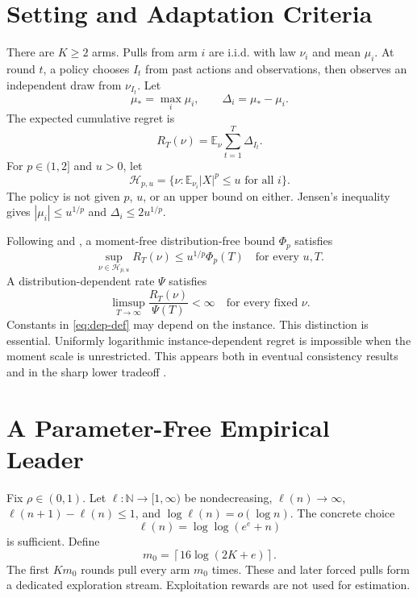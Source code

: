 \documentclass[twoside]{article}
\newcommand{\E}{\mathbb E}
\newcommand{\cH}{\mathcal H}
\begin{document}
\section{Setting and Adaptation Criteria}
\label{sec:setting}

There are $K\geq2$ arms. Pulls from arm $i$ are i.i.d. with law $\nu_i$
and mean $\mu_i$. At round $t$, a policy chooses $I_t$ from past actions and
observations, then observes an independent draw from $\nu_{I_t}$. Let
\[
 \mu_*=\max_i\mu_i,\qquad \Delta_i=\mu_*-\mu_i.
\]
The expected cumulative regret is
\[
 R_T(\nu)=\E_\nu\sum_{t=1}^T\Delta_{I_t}.
\]
For $p\in(1,2]$ and $u>0$, let
\[
 \cH_{p,u}=\{\nu: \E_{\nu_i}|X|^p\leq u\text{ for all }i\}.
\]
The policy is not given $p$, $u$, or an upper bound on either. Jensen's
inequality gives $|\mu_i|\leq u^{1/p}$ and $\Delta_i\leq2u^{1/p}$.

Following \citet{hadiji2023range} and \citet{genalti2025lower}, a
moment-free distribution-free bound $\Phi_p$ satisfies
\begin{equation}
 \sup_{\nu\in\cH_{p,u}}R_T(\nu)
 \leq u^{1/p}\Phi_p(T)
 \quad\text{for every }u,T.
 \label{eq:free-def}
\end{equation}
A distribution-dependent rate $\Psi$ satisfies
\begin{equation}
 \limsup_{T\to\infty}\frac{R_T(\nu)}{\Psi(T)}<\infty
 \quad\text{for every fixed }\nu.
 \label{eq:dep-def}
\end{equation}
Constants in \eqref{eq:dep-def} may depend on the instance. This distinction
is essential. Uniformly logarithmic instance-dependent regret is impossible
when the moment scale is unrestricted. This appears both in eventual
consistency results \citep{ashutosh2021letting} and in the sharp lower
tradeoff \citep{genalti2025lower}.

\section{A Parameter-Free Empirical Leader}
\label{sec:algorithm}

Fix $\rho\in(0,1)$. Let $\ell:\mathbb N\to[1,\infty)$ be nondecreasing,
$\ell(n)\to\infty$, $\ell(n+1)-\ell(n)\leq1$, and
$\log\ell(n)=o(\log n)$. The concrete choice
\begin{equation}
 \ell(n)=\log\log(e^e+n)
 \label{eq:ell}
\end{equation}
is sufficient. Define
\[
 m_0=\left\lceil16\log(2K+e)\right\rceil.
\]
The first $Km_0$ rounds pull every arm $m_0$ times. These and later forced
pulls form a dedicated exploration stream. Exploitation rewards are not used
for estimation.
\end{document}

